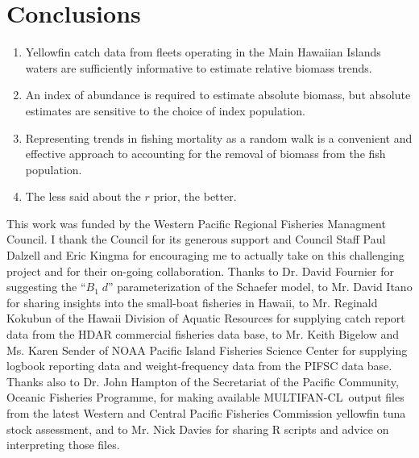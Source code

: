 \documentclass[12pt,letterpaper,twoside]{article}
\newcommand\MFCL{MULTIFAN-CL}
\newcommand\Bd{B_1\; d}
\begin{document}
\section{Conclusions}
\begin{enumerate}
\item Yellowfin catch data from fleets operating in the Main Hawaiian
Islands waters are sufficiently informative to estimate relative
biomass trends.
\item An index of abundance is required to estimate absolute biomass,
but absolute estimates are sensitive to the choice of index
population.
\item Representing trends in fishing mortality as a random walk is a
convenient and effective approach to accounting for the removal of
biomass from the fish population.
\item The less said about the $r$ prior, the better.
\end{enumerate}

\vspace{4ex}
{}
This work was funded by the Western Pacific Regional Fisheries
Managment Council. I thank the Council for its generous support and
Council Staff Paul Dalzell and Eric Kingma for encouraging me to
actually take on this challenging project and for their on-going
collaboration.
Thanks to Dr. David Fournier for suggesting the ``$\Bd$''
parameterization of the Schaefer model,
to Mr. David Itano for sharing insights into the small-boat
fisheries in Hawaii,
to Mr. Reginald Kokubun of the Hawaii Division of Aquatic
Resources for supplying catch report data from the HDAR commercial
fisheries data base,
to Mr. Keith Bigelow and Ms. Karen Sender of NOAA Pacific
Island Fisheries Science Center for supplying logbook reporting data and
weight-frequency data from the PIFSC data base.
Thanks also to Dr. John Hampton of the Secretariat of the Pacific
Community, Oceanic Fisheries Programme, for making available \MFCL\
output files from the latest Western and Central Pacific
Fisheries Commission yellowfin tuna stock assessment, and to Mr. Nick
Davies for sharing R scripts and advice on interpreting those files.
\end{document}
